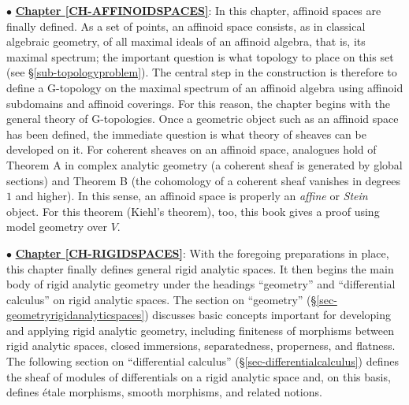 \documentclass[a4paper,12pt, dvipdfmx]{jsbook}
\theoremstyle{plain}
\theoremstyle{definition}
\begin{document}
\medskip
$\bullet$ \underline{{\bf Chapter \ref{CH-AFFINOIDSPACES}}}: In this chapter, affinoid spaces are finally defined.
As a set of points, an affinoid space consists, as in classical algebraic geometry, of all maximal ideals of an affinoid algebra, that is, its maximal spectrum; the important question is what topology to place on this set (see \S\ref{sub-topologyproblem}).
The central step in the construction is therefore to define a G-topology on the maximal spectrum of an affinoid algebra using affinoid subdomains and affinoid coverings.
For this reason, the chapter begins with the general theory of G-topologies.
Once a geometric object such as an affinoid space has been defined, the immediate question is what theory of sheaves can be developed on it.
For coherent sheaves on an affinoid space, analogues hold of Theorem A in complex analytic geometry (a coherent sheaf is generated by global sections) and Theorem B (the cohomology of a coherent sheaf vanishes in degrees $1$ and higher).
In this sense, an affinoid space is properly an {\it affine} or {\it Stein} object.
For this theorem (Kiehl's theorem), too, this book gives a proof using model geometry over $V$.

\medskip
$\bullet$ \underline{{\bf Chapter \ref{CH-RIGIDSPACES}}}: With the foregoing preparations in place, this chapter finally defines general rigid analytic spaces. It then begins the main body of rigid analytic geometry under the headings ``geometry'' and ``differential calculus'' on rigid analytic spaces.
The section on ``geometry'' (\S\ref{sec-geometryrigidanalyticspaces}) discusses basic concepts important for developing and applying rigid analytic geometry, including finiteness of morphisms between rigid analytic spaces, closed immersions, separatedness, properness, and flatness.
The following section on ``differential calculus'' (\S\ref{sec-differentialcalculus}) defines the sheaf of modules of differentials on a rigid analytic space and, on this basis, defines \'etale morphisms, smooth morphisms, and related notions.
\end{document}
